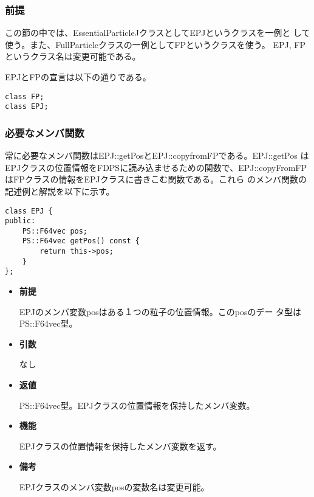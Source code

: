 \subsubsection{前提}

この節の中では、EssentialParticleJクラスとしてEPJというクラスを一例と
して使う。また、FullParticleクラスの一例としてFPというクラスを使う。
EPJ, FPというクラス名は変更可能である。

EPJとFPの宣言は以下の通りである。
\begin{screen}
\begin{verbatim}
class FP;
class EPJ;
\end{verbatim}
\end{screen}

\subsubsection{必要なメンバ関数}


常に必要なメンバ関数はEPJ::getPosとEPJ::copyfromFPである。EPJ::getPos
はEPJクラスの位置情報をFDPSに読み込ませるための関数で、EPJ::copyFromFP
はFPクラスの情報をEPJクラスに書きこむ関数である。これら
のメンバ関数の記述例と解説を以下に示す。


\begin{screen}
\begin{verbatim}
class EPJ {
public:
    PS::F64vec pos;
    PS::F64vec getPos() const {
        return this->pos;
    }
};
\end{verbatim}
\end{screen}

\begin{itemize}

\item {\bf 前提}
  
  EPJのメンバ変数posはある１つの粒子の位置情報。このposのデー
  タ型はPS::F64vec型。
  
\item {\bf 引数}

  なし
  
\item {\bf 返値}

  PS::F64vec型。EPJクラスの位置情報を保持したメンバ変数。
  
\item {\bf 機能}

  EPJクラスの位置情報を保持したメンバ変数を返す。
  
\item {\bf 備考}

  EPJクラスのメンバ変数posの変数名は変更可能。

\end{itemize}

